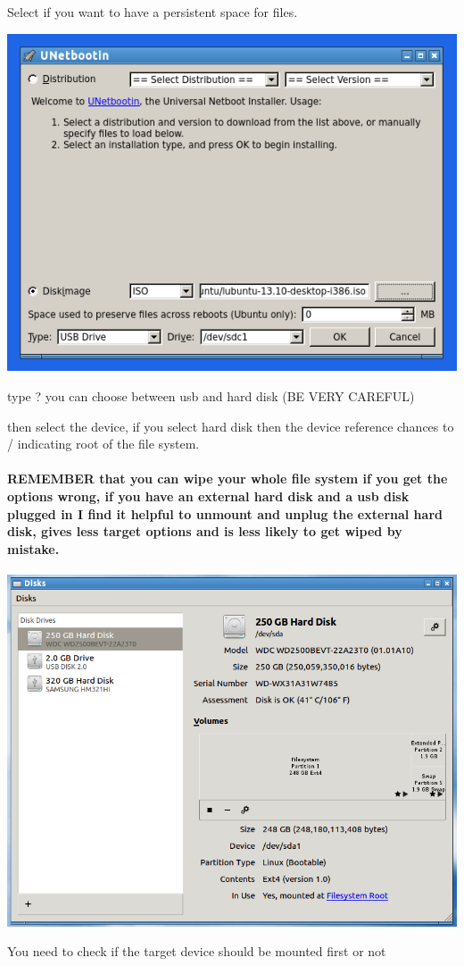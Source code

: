 \documentclass[12pt,a4paper]{book}
\begin{document}
Select if you want to have a persistent space for files.


\begin{center}
\includegraphics[width=0.7\linewidth]{unetbootin3}
\end{center}

type ? you can choose between usb and hard disk (BE VERY CAREFUL)

then select the device, if you select hard disk then the device reference chances to / indicating root of the file system.

\paragraph{REMEMBER that you can wipe your whole file system if you get the options wrong,  if you have an external hard disk and a usb disk plugged in I find it helpful to unmount and unplug the external hard disk,  gives less target options and is less likely to get wiped by mistake.}

 
\begin{center}
\includegraphics[width=0.7\linewidth]{unetbootin4}
\end{center}
You need to check if the target device should be mounted first or not
\end{document}

